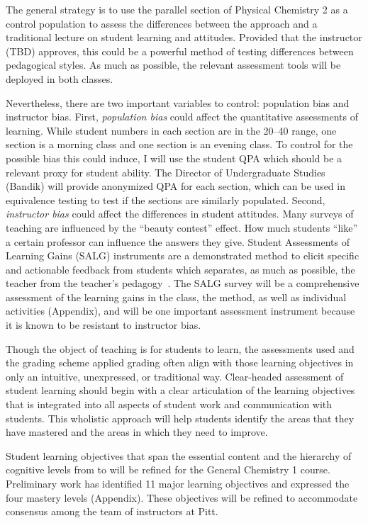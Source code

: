\documentclass[10pt,letterpaper]{article}
\begin{document}
{The general strategy is to use the parallel section of Physical Chemistry 2 as a control population to assess the differences between the \pogil approach and a traditional lecture on student learning and attitudes. Provided that the instructor (TBD) approves, this could be a powerful method of testing differences between pedagogical styles. As much as possible, the relevant assessment tools will be deployed in both classes. 

Nevertheless, there are two important variables to control: population bias and instructor bias. First, \textit{population bias} could affect the quantitative assessments of learning. While student numbers in each section are in the 20--40 range, one section is a morning class and one section is an evening class. To control for the possible bias this could induce, I will use the student QPA which should be a relevant proxy for student ability. The Director of Undergraduate Studies (Bandik) will provide anonymized QPA for each section, which can be used in equivalence testing to test if the sections are similarly populated. Second, \textit{instructor bias} could affect the differences in student attitudes. Many surveys of teaching are influenced by the ``beauty contest'' effect. How much students ``like'' a certain professor can influence the answers they give. Student Assessments of Learning Gains (SALG) instruments are a demonstrated method to elicit specific and actionable feedback from students which separates, as much as possible, the teacher from the teacher's pedagogy~\cite{Seymour2000}. The SALG survey will be a comprehensive assessment of the learning gains in the class, the \pogil method, as well as individual activities (Appendix), and will be one important assessment instrument because it is known to be resistant to instructor bias.
}%

%
%
Though the object of teaching is for students to learn,  the assessments used and the grading scheme applied grading often align with those learning objectives in only an intuitive, unexpressed, or traditional way. Clear-headed assessment of student learning should begin with a clear articulation of the learning objectives that is integrated into all aspects of student work and communication with students. This wholistic approach will help students identify the areas that they have mastered and the areas in which  they need to improve.

Student learning objectives that span the essential content and the hierarchy of cognitive levels from \recall to \use will be refined for the General Chemistry 1 course. Preliminary work has identified 11 major learning objectives and expressed the four mastery levels (Appendix). These objectives will be refined to accommodate consensus among the team of \pogil instructors at Pitt. 
\end{document}
